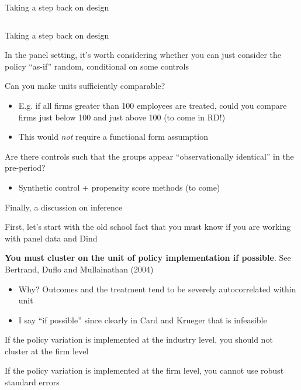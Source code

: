 \documentclass[notes,11pt, aspectratio=169]{beamer}
\newenvironment{wideitemize}{\itemize\addtolength{\itemsep}{10pt}}{\enditemize}
\begin{document}
\begin{frame}{Taking a step back on design}
\begin{columns}[T]
\begin{column}{.5\textwidth}
    \end{column}
    \end{columns}
\end{frame}

\begin{frame}{Taking a step back on design}
  \begin{wideitemize}
  \item In the panel setting, it's worth considering whether you can just consider the policy ``as-if'' random, conditional on some controls
  \item Can you make units sufficiently comparable?
    \begin{itemize}
    \item E.g. if all firms greater than 100 employees are treated,
      could you compare firms just below 100 and just above 100 (to
      come in RD!)
    \item This would \emph{not} require a functional form assumption
    \end{itemize}
  \item Are there controls such that the groups appear ``observationally identical'' in the pre-period?
    \begin{itemize}
    \item Synthetic control + propensity score methods (to come)
    \end{itemize}
  \end{wideitemize}
\end{frame}


\begin{frame}{Finally, a discussion on inference}
  \begin{wideitemize}
  \item First, let's start with the old school fact that you must know
    if you are working with panel data and Dind
  \item \textbf{You must cluster on the unit of policy implementation
      if possible}. See Bertrand, Duflo and Mullainathan (2004)
    \begin{itemize}
    \item Why? Outcomes and the treatment tend to be severely
      autocorrelated within unit
    \item I say ``if possible'' since clearly in Card and Krueger that
      is infeasible
    \end{itemize}
  \item If the policy variation is implemented at the industry level,
    you should not cluster at the firm level
  \item If the policy variation is implemented at the firm level, you
    cannot use robust standard errors
  \end{wideitemize}
\end{frame}
\end{document}

